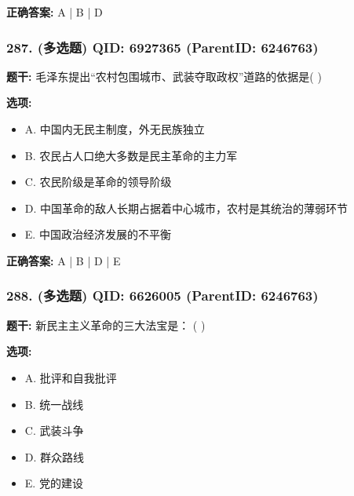 \documentclass[12pt,UTF8]{ctexart}
\begin{document}
\textbf{正确答案:}
A | B | D

\vspace{0.3em}\hrulefill\vspace{0.7em}

\subsubsection*{287. (多选题) \small QID: 6927365 (ParentID: 6246763)}

\textbf{题干:}
毛泽东提出“农村包围城市、武装夺取政权”道路的依据是(   )



\textbf{选项:}
\begin{itemize}[leftmargin=*]

  \item A. 中国内无民主制度，外无民族独立

  \item B. 农民占人口绝大多数是民主革命的主力军

  \item C. 农民阶级是革命的领导阶级

  \item D. 中国革命的敌人长期占据着中心城市，农村是其统治的薄弱环节

  \item E. 中国政治经济发展的不平衡

\end{itemize}

\textbf{正确答案:}
A | B | D | E

\vspace{0.3em}\hrulefill\vspace{0.7em}

\subsubsection*{288. (多选题) \small QID: 6626005 (ParentID: 6246763)}

\textbf{题干:}
新民主主义革命的三大法宝是： ( )



\textbf{选项:}
\begin{itemize}[leftmargin=*]

  \item A. 批评和自我批评

  \item B. 统一战线

  \item C. 武装斗争

  \item D. 群众路线

  \item E. 党的建设

\end{itemize}
\end{document}
